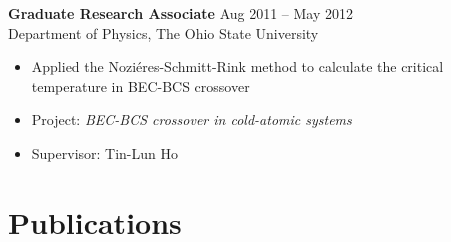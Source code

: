 \documentclass[11pt]{../yhlcv}
\begin{document}
{\bf Graduate Research Associate} \hfill Aug 2011 -- May 2012 \vspace{0.25em} \\
Department of Physics, The Ohio State University
\vspace{-0.7em}\\
\begin{itemize}[leftmargin=*]\itemsep-0.2em
\item Applied the Nozi\'{e}res-Schmitt-Rink method to calculate the critical temperature in
	BEC-BCS crossover
\item[] Project: {\it BEC-BCS crossover in cold-atomic systems}
\item[] Supervisor: Tin-Lun Ho
\end{itemize}

\section*{Publications}
\end{document}
